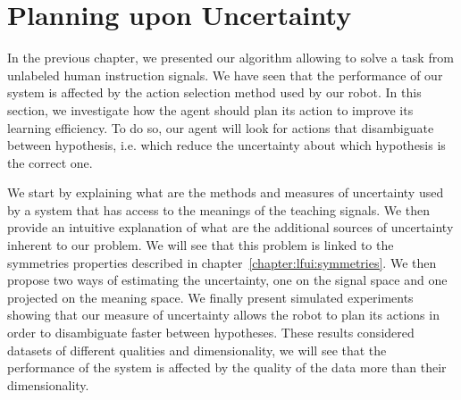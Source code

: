 
\chapter{Planning upon Uncertainty}
\label{chapter:planning}
\minitoc


In the previous chapter, we presented our algorithm allowing to solve a task from unlabeled human instruction signals. We have seen that the performance of our system is affected by the action selection method used by our robot. In this section, we investigate how the agent should plan its action to improve its learning efficiency. To do so, our agent will look for actions that disambiguate between hypothesis, i.e. which reduce the uncertainty about which hypothesis is the correct one.

We start by explaining what are the methods and measures of uncertainty used by a system that has access to the meanings of the teaching signals. We then provide an intuitive explanation of what are the additional sources of uncertainty inherent to our problem. We will see that this problem is linked to the symmetries properties described in chapter~\ref{chapter:lfui:symmetries}. We then propose two ways of estimating the uncertainty, one on the signal space and one projected on the meaning space. We finally present simulated experiments showing that our measure of uncertainty allows the robot to plan its actions in order to disambiguate faster between hypotheses. These results considered datasets of different qualities and dimensionality, we will see that the performance of the system is affected by the quality of the data more than their dimensionality. 


